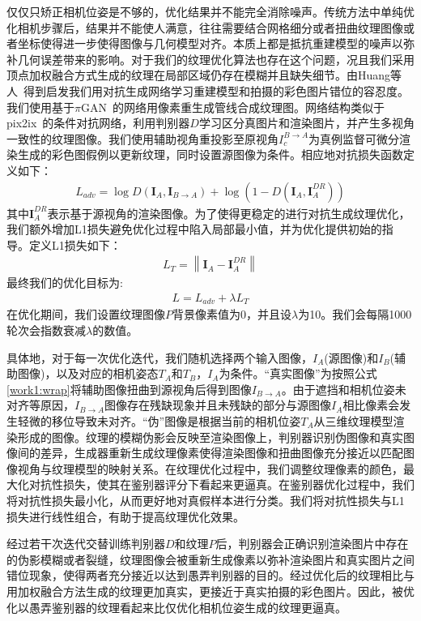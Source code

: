 仅仅只矫正相机位姿是不够的，优化结果并不能完全消除噪声。传统方法中单纯优化相机步骤后，结果并不能使人满意，往往需要结合网格细分或者扭曲纹理图像或者坐标使得进一步使得图像与几何模型对齐。本质上都是抵抗重建模型的噪声以弥补几何误差带来的影响。对于我们的纹理优化算法也存在这个问题，况且我们采用顶点加权融合方式生成的纹理在局部区域仍存在模糊并且缺失细节。由Huang等人~\cite{JingweiHuang2020AdversarialTO}得到启发我们用对抗生成网络学习重建模型和拍摄的彩色图片错位的容忍度。我们使用基于$\pi$GAN~\cite{chanmonteiro2020pi-GAN,liu2018intriguing}的网络用像素重生成管线合成纹理图。网络结构类似于pix2ix~\cite{isola2017image}的条件对抗网络，利用判别器$D$学习区分真图片和渲染图片，并产生多视角一致性的纹理图像。我们使用辅助视角重投影至原视角$I_c^{B\to A}$为真例监督可微分渲染生成的彩色图假例以更新纹理，同时设置源图像为条件。相应地对抗损失函数定义如下：
\begin{align}
	L_{a d v}=\log D\left(\boldsymbol{I}_{A}, \boldsymbol{I}_{B \rightarrow A}\right)+\log \left(1-D\left(\boldsymbol{I}_{A}, \boldsymbol{I}_{A}^{D R}\right)\right) 
\end{align}
其中$\boldsymbol{I}_{A}^{D R}$表示基于源视角的渲染图像。为了使得更稳定的进行对抗生成纹理优化，我们额外增加L1损失避免优化过程中陷入局部最小值，并为优化提供初始的指导。定义L1损失如下：
\begin{align}
L_T = \left \| \boldsymbol{I}_{A}- \boldsymbol{I}_{A}^{D R} \right \| 
\end{align}
最终我们的优化目标为:
\begin{align}
	L = L_{adv} + \lambda L_T \label{texture}
\end{align}
在优化期间，我们设置纹理图像$P$背景像素值为0，并且设$\lambda$为10。我们会每隔1000轮次会指数衰减$\lambda$的数值。\par
具体地，对于每一次优化迭代，我们随机选择两个输入图像，$I_A$(源图像)和$I_B$(辅助图像)，以及对应的相机姿态$T_A$和$T_B$，$I_A$为条件。“真实图像”为按照公式\ref{work1:wrap}将辅助图像扭曲到源视角后得到图像$I_{B\to A}$。由于遮挡和相机位姿未对齐等原因，$I_{B\to A}$图像存在残缺现象并且未残缺的部分与源图像$I_A$相比像素会发生轻微的移位导致未对齐。“伪”图像是根据当前的相机位姿$T_A$从三维纹理模型渲染形成的图像。纹理的模糊伪影会反映至渲染图像上，判别器识别伪图像和真实图像间的差异，生成器重新生成纹理像素使得渲染图像和扭曲图像充分接近以匹配图像视角与纹理模型的映射关系。在纹理优化过程中，我们调整纹理像素的颜色，最大化对抗性损失，使其在鉴别器评分下看起来更逼真。在鉴别器优化过程中，我们将对抗性损失最小化，从而更好地对真假样本进行分类。我们将对抗性损失与L1损失进行线性组合，有助于提高纹理优化效果。\par
经过若干次迭代交替训练判别器$D$和纹理$P$后，判别器会正确识别渲染图片中存在的伪影模糊或者裂缝，纹理图像会被重新生成像素以弥补渲染图片和真实图片之间错位现象，使得两者充分接近以达到愚弄判别器的目的。经过优化后的纹理相比与用加权融合方法生成的纹理更加真实，更接近于真实拍摄的彩色图片。因此，被优化以愚弄鉴别器的纹理看起来比仅优化相机位姿生成的纹理更逼真。\par


